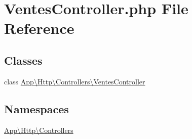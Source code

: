 \hypertarget{_ventes_controller_8php}{}\section{Ventes\+Controller.\+php File Reference}
\label{_ventes_controller_8php}
\subsection*{Classes}
\begin{DoxyCompactItemize}
\item 
class \mbox{\hyperlink{class_app_1_1_http_1_1_controllers_1_1_ventes_controller}{App\textbackslash{}\+Http\textbackslash{}\+Controllers\textbackslash{}\+Ventes\+Controller}}
\end{DoxyCompactItemize}
\subsection*{Namespaces}
\begin{DoxyCompactItemize}
\item 
 \mbox{\hyperlink{namespace_app_1_1_http_1_1_controllers}{App\textbackslash{}\+Http\textbackslash{}\+Controllers}}
\end{DoxyCompactItemize}
